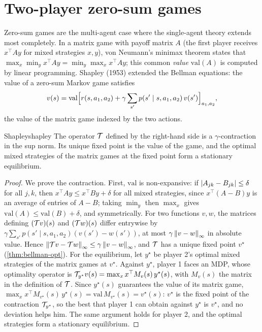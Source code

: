 \section{Two-player zero-sum games}

Zero-sum games are the multi-agent case where the single-agent theory
extends most completely. In a matrix game with payoff matrix $A$ (the
first player receives $x^\top A y$ for mixed strategies $x, y$), von
Neumann's minimax theorem states that $\max_x \min_y x^\top A y = \min_y
\max_x x^\top A y$; this common \emph{value} $\mathrm{val}(A)$ is computed
by linear programming. Shapley (1953) extended the Bellman equations: the
value of a zero-sum Markov game satisfies
\begin{equation}
  v(s) = \mathrm{val}\Bigl[ r(s, a_1, a_2) + \gamma \sum_{s'} p(s' \mid s,
  a_1, a_2)\, v(s') \Bigr]_{a_1, a_2},
\end{equation}
the value of the matrix game indexed by the two actions.

\begin{theorem}{Shapley}{shapley}
  The operator $\mathcal{T}$ defined by the right-hand side is a $\gamma$-contraction
  in the sup norm. Its unique fixed point is the value of the game, and the
  optimal mixed strategies of the matrix games at the fixed point form a
  stationary equilibrium.
\end{theorem}

\begin{proof}
  We prove the contraction. First, $\mathrm{val}$ is non-expansive: if
  $\left\lvert A_{jk} - B_{jk} \right\rvert \leq \delta$ for all $j, k$, then $x^\top A y \leq
  x^\top B y + \delta$ for all mixed strategies, since $x^\top (A - B) y$
  is an average of entries of $A - B$; taking $\min_y$ then $\max_x$ gives
  $\mathrm{val}(A) \leq \mathrm{val}(B) + \delta$, and symmetrically. For two
  functions $v, w$, the matrices defining $(\mathcal{T} v)(s)$ and $(\mathcal{T} w)(s)$
  differ entrywise by $\gamma \sum_{s'} p(s' \mid s, a_1, a_2) (v(s') -
  w(s'))$, at most $\gamma \left\lVert v - w \right\rVert_\infty$ in absolute value. Hence
  $\left\lVert \mathcal{T} v - \mathcal{T} w \right\rVert_\infty \leq \gamma \left\lVert v - w \right\rVert_\infty$, and $\mathcal{T}$ has
  a unique fixed point $v^\star$ (\cref{thm:bellman-opt}). For the
  equilibrium, let $y^\star$ be player 2's optimal mixed strategies of the
  matrix games at $v^\star$. Against $y^\star$, player 1 faces an MDP,
  whose optimality operator is $\mathcal{T}_{y^\star} v(s) = \max_x x^\top M_v(s)\,
  y^\star(s)$, with $M_v(s)$ the matrix in the definition of $\mathcal{T}$. Since
  $y^\star(s)$ guarantees the value of its matrix game, $\max_x x^\top
  M_{v^\star}(s)\, y^\star(s) = \mathrm{val}\, M_{v^\star}(s) = v^\star(s)$:
  $v^\star$ is the fixed point of the contraction $\mathcal{T}_{y^\star}$, so the best
  that player 1 can obtain against $y^\star$ is $v^\star$, and no deviation
  helps him. The same argument holds for player 2, and the optimal
  strategies form a stationary equilibrium.
\end{proof}

